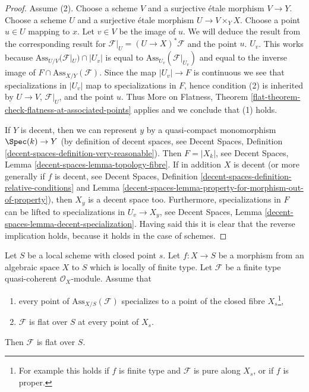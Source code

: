 \begin{proof}
Assume (2).
Choose a scheme $V$ and a surjective \'etale morphism $V \to Y$.
Choose a scheme $U$ and a surjective \'etale morphism $U \to V \times_Y X$.
Choose a point $u \in U$ mapping to $x$. Let $v \in V$ be the image of $u$.
We will deduce the result from the corresponding result for
$\mathcal{F}|_U = (U \to X)^*\mathcal{F}$ and the point $u$.
$U_v$. This works because $\text{Ass}_{U/V}(\mathcal{F}|_U) \cap |U_v|$
is equal to $\text{Ass}_{U_v}(\mathcal{F}|_{U_v})$ and equal to the inverse
image of $F \cap \text{Ass}_{X/Y}(\mathcal{F})$.
Since the map $|U_v| \to F$ is continuous we see that
specializations in $|U_v|$ map to specializations in $F$,
hence condition (2) is inherited by $U \to V$,
$\mathcal{F}|_U$, and the point $u$.
Thus More on Flatness, Theorem
\ref{flat-theorem-check-flatness-at-associated-points} applies
and we conclude that (1) holds.

\medskip\noindent
If $Y$ is decent, then we can represent
$y$ by a quasi-compact monomorphism $\Spec(k) \to Y$
(by definition of decent spaces, see
Decent Spaces, Definition \ref{decent-spaces-definition-very-reasonable}).
Then $F = |X_k|$, see
Decent Spaces, Lemma \ref{decent-spaces-lemma-topology-fibre}.
If in addition $X$ is decent (or more generally if $f$ is decent, see
Decent Spaces, Definition \ref{decent-spaces-definition-relative-conditions}
and
Lemma \ref{decent-spaces-lemma-property-for-morphism-out-of-property}),
then $X_y$ is a decent space too. Furthermore, specializations in
$F$ can be lifted to specializations
in $U_v \to X_y$, see
Decent Spaces, Lemma \ref{decent-spaces-lemma-decent-specialization}.
Having said this it is clear that the reverse implication
holds, because it holds in the case of schemes.
\end{proof}

\begin{lemma}
\label{lemma-check-along-closed-fibre}
Let $S$ be a local scheme with closed point $s$.
Let $f : X \to S$ be a morphism from an algebraic space $X$ to $S$
which is locally of finite type.
Let $\mathcal{F}$ be a finite type quasi-coherent $\mathcal{O}_X$-module.
Assume that
\begin{enumerate}
\item every point of $\text{Ass}_{X/S}(\mathcal{F})$ specializes
to a point of the closed fibre $X_s$\footnote{For example this holds if
$f$ is finite type and $\mathcal{F}$ is pure along $X_s$, or
if $f$ is proper.},
\item $\mathcal{F}$ is flat over $S$ at every point of $X_s$.
\end{enumerate}
Then $\mathcal{F}$ is flat over $S$.
\end{lemma}


